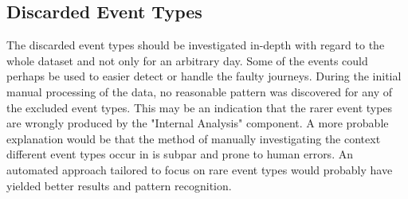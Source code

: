 \subsection{Discarded Event Types}
The discarded event types should be investigated in-depth with regard to the whole dataset and not only for an arbitrary day.
Some of the events could perhaps be used to easier detect or handle the faulty journeys.
During the initial manual processing of the data, no reasonable pattern was discovered for any of the excluded event types.
This may be an indication that the rarer event types are wrongly produced by the "Internal Analysis" component.
A more probable explanation would be that the method of manually investigating the context different event types occur in is subpar and prone to human errors.
An automated approach tailored to focus on rare event types would probably have yielded better results and pattern recognition.